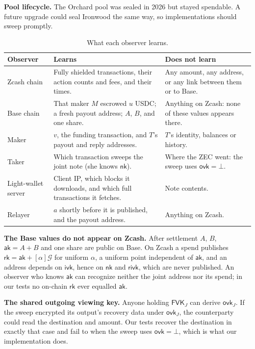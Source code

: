\documentclass[10pt,letterpaper]{article}
\makeatletter
\renewcommand\section{\@startsection{section}{1}{\z@}{-1.3em}{0.45em}{\normalfont\large\bfseries}}
\newcommand{\ak}{\mathsf{ak}}
\newcommand{\nk}{\mathsf{nk}}
\newcommand{\rivk}{\mathsf{rivk}}
\newcommand{\ivk}{\mathsf{ivk}}
\newcommand{\ovk}{\mathsf{ovk}}
\newcommand{\rk}{\mathsf{rk}}
\newcommand{\fvk}{\mathsf{FVK}}
\newcommand{\Gor}{\mathcal{G}}
\makeatother
\begin{document}
\textbf{Pool lifecycle.} The Orchard pool was sealed in 2026 but stayed spendable. A future upgrade
could seal Ironwood the same way, so implementations should sweep promptly.

\section{Privacy}

\begin{table}[H]
\centering\small
\begin{tabularx}{\linewidth}{@{}p{2.8cm}XX@{}}
\toprule
\textbf{Observer} & \textbf{Learns} & \textbf{Does not learn}\\
\midrule
Zcash chain & Fully shielded transactions, their action counts and fees, and their times. & Any amount, any address, or any link between them or to Base.\\
Base chain & That maker $M$ escrowed $u$ USDC; a fresh payout address; $A$, $B$, and one share. & Anything on Zcash: none of these values appears there.\\
Maker & $v$, the funding transaction, and $T$'s payout and reply addresses. & $T$'s identity, balances or history.\\
Taker & Which transaction sweeps the joint note (she knows $\nk$). & Where the ZEC went: the sweep uses $\ovk = \bot$.\\
Light-wallet server & Client IP, which blocks it downloads, and which full transactions it fetches. & Note contents.\\
Relayer & $a$ shortly before it is published, and the payout address. & Anything on Zcash.\\
\bottomrule
\end{tabularx}
\caption{What each observer learns.}
\end{table}

\textbf{The Base values do not appear on Zcash.} After settlement $A$, $B$, $\ak = A + B$ and one share
are public on Base. On Zcash a spend publishes $\rk = \ak + [\alpha]\Gor$ for uniform $\alpha$, a
uniform point independent of $\ak$, and an address depends on $\ivk$, hence on $\nk$ and $\rivk$, which
are never published. An observer who knows $\ak$ can recognize neither the joint address nor its
spend; in our tests no on-chain $\rk$ ever equalled $\ak$.

\textbf{The shared outgoing viewing key.} Anyone holding $\fvk_J$ can derive $\ovk_J$. If the sweep
encrypted its output's recovery data under $\ovk_J$, the counterparty could read the destination and
amount. Our tests recover the destination in exactly that case and fail to when the sweep uses
$\ovk = \bot$, which is what our implementation does.
\end{document}
